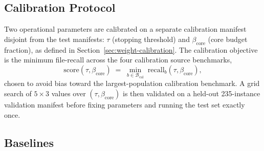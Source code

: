 \documentclass[11pt, a4paper]{article}
\begin{document}
\subsection{Calibration Protocol}

Two operational parameters are calibrated on a separate calibration manifest disjoint from the test manifests: $\tau$ (stopping threshold) and $\beta_{\mathrm{core}}$ (core budget fraction), as defined in Section~\ref{sec:weight-calibration}. The calibration objective is the minimum file-recall across the four calibration source benchmarks,
\begin{equation}
\mathrm{score}(\tau, \beta_{\mathrm{core}}) \;=\; \min_{b \in \mathcal{B}_{\mathrm{cal}}} \; \mathrm{recall}_b(\tau, \beta_{\mathrm{core}}),
\end{equation}
chosen to avoid bias toward the largest-population calibration benchmark. A grid search of $5{\times}3$ values over $(\tau, \beta_{\mathrm{core}})$ is then validated on a held-out 235-instance validation manifest before fixing parameters and running the test set exactly once.

\subsection{Baselines}
\end{document}
